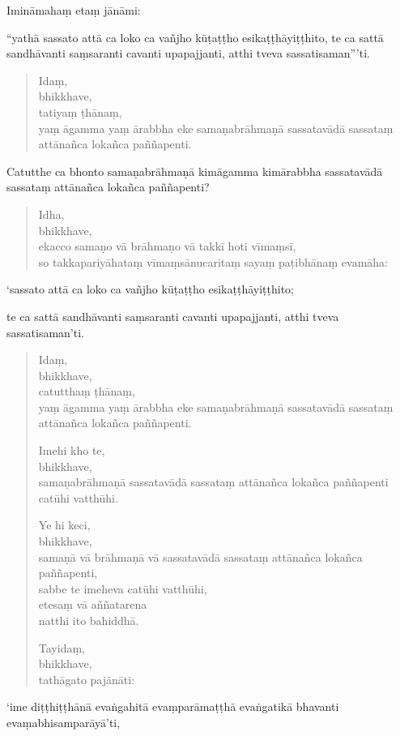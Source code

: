 \documentclass[11pt,twoside,openright]{book}
\begin{document}
\pstart
Imināmahaṃ etaṃ jānāmi:
\pend

\pstart
“yathā sassato attā ca loko ca vañjho kūṭaṭṭho esikaṭṭhāyiṭṭhito, te ca sattā sandhāvanti saṃsaranti cavanti upapajjanti, atthi tveva sassatisaman”’ti.
\pend

\begin{verse}
Idaṃ,\\
\vin  bhikkhave,\\
\vin  tatiyaṃ ṭhānaṃ,\\
\vin  yaṃ āgamma yaṃ ārabbha eke samaṇabrāhmaṇā sassatavādā sassataṃ attānañca lokañca paññapenti.

\end{verse}
\pstart
Catutthe ca bhonto samaṇabrāhmaṇā kimāgamma kimārabbha sassatavādā sassataṃ attānañca lokañca paññapenti?
\pend

\begin{verse}
Idha,\\
\vin  bhikkhave,\\
\vin  ekacco samaṇo vā brāhmaṇo vā takkī hoti vīmaṃsī,\\
\vin  so takkapariyāhataṃ vīmaṃsānucaritaṃ sayaṃ paṭibhānaṃ evamāha:

\end{verse}
\pstart
‘sassato attā ca loko ca vañjho kūṭaṭṭho esikaṭṭhāyiṭṭhito;
\pend

\pstart
te ca sattā sandhāvanti saṃsaranti cavanti upapajjanti, atthi tveva sassatisaman’ti.
\pend

\begin{verse}
Idaṃ,\\
\vin  bhikkhave,\\
\vin  catutthaṃ ṭhānaṃ,\\
\vin  yaṃ āgamma yaṃ ārabbha eke samaṇabrāhmaṇā sassatavādā sassataṃ attānañca lokañca paññapenti.

Imehi kho te,\\
\vin  bhikkhave,\\
\vin  samaṇabrāhmaṇā sassatavādā sassataṃ attānañca lokañca paññapenti catūhi vatthūhi.

Ye hi keci,\\
\vin  bhikkhave,\\
\vin  samaṇā vā brāhmaṇā vā sassatavādā sassataṃ attānañca lokañca paññapenti,\\
\vin  sabbe te imeheva catūhi vatthūhi,\\
\vin  etesaṃ vā aññatarena\\
 natthi ito bahiddhā.

Tayidaṃ,\\
\vin  bhikkhave,\\
\vin  tathāgato pajānāti:

\end{verse}
\pstart
‘ime diṭṭhiṭṭhānā evaṅgahitā evaṃparāmaṭṭhā evaṅgatikā bhavanti evaṃabhisamparāyā’ti,
\pend
\end{document}
